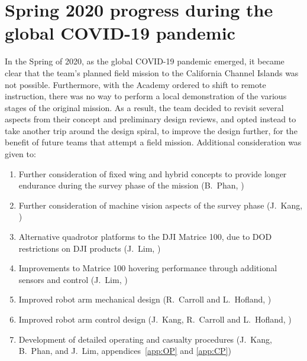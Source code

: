 \section*{Spring 2020 progress during the global COVID-19 pandemic}
In the Spring of 2020, as the global COVID-19 pandemic emerged, it became clear that the team's planned field mission to the California Channel Islands was not possible. Furthermore, with the Academy ordered to shift to remote instruction, there was no way to perform a local demonstration of the various stages of the original mission. As a result, the team decided to revisit several aspects from their concept and preliminary design reviews, and opted instead to take another trip around the design spiral, to improve the design further, for the benefit of future teams that attempt a field mission. Additional consideration was given to:
\begin{enumerate}
\item Further consideration of fixed wing and hybrid concepts to provide longer endurance during the survey phase of the mission (B.~Phan, )
\item Further consideration of machine vision aspects of the survey phase (J.~Kang, )
\item Alternative quadrotor platforms to the DJI Matrice 100, due to DOD restrictions on DJI products (J.~Lim, )
\item Improvements to Matrice 100 hovering performance through additional sensors and control (J.~Lim, )
\item Improved robot arm mechanical design (R.~Carroll and L.~Hofland, )
\item Improved robot arm control design (J.~Kang, R.~Carroll and L.~Hofland, )
\item Development of detailed operating and casualty procedures (J.~Kang, B.~Phan, and J.~Lim, appendices~\ref{app:OP} and \ref{app:CP})
\end{enumerate}

